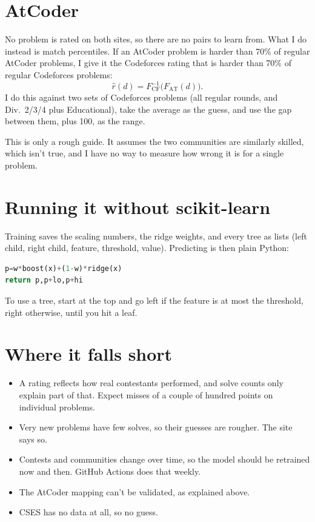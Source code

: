 \documentclass[11pt,a4paper]{article}
\begin{document}
\section{AtCoder}

No problem is rated on both sites, so there are no pairs to learn from. What I do instead is match percentiles. If an AtCoder problem is harder than 70\% of regular AtCoder problems, I give it the Codeforces rating that is harder than 70\% of regular Codeforces problems:
\begin{equation}
\hat r(d)=F_{\text{CF}}^{-1}\bigl(F_{\text{AT}}(d)\bigr).
\end{equation}
I do this against two sets of Codeforces problems (all regular rounds, and Div.~2/3/4 plus Educational), take the average as the guess, and use the gap between them, plus 100, as the range.

This is only a rough guide. It assumes the two communities are similarly skilled, which isn't true, and I have no way to measure how wrong it is for a single problem.

\section{Running it without scikit-learn}

Training saves the scaling numbers, the ridge weights, and every tree as lists (left child, right child, feature, threshold, value). Predicting is then plain Python:

\begin{lstlisting}[language=Python]
p=w*boost(x)+(1-w)*ridge(x)
return p,p+lo,p+hi
\end{lstlisting}

To use a tree, start at the top and go left if the feature is at most the threshold, right otherwise, until you hit a leaf.

\section{Where it falls short}

\begin{itemize}[nosep]
\item A rating reflects how real contestants performed, and solve counts only explain part of that. Expect misses of a couple of hundred points on individual problems.
\item Very new problems have few solves, so their guesses are rougher. The site says so.
\item Contests and communities change over time, so the model should be retrained now and then. GitHub Actions does that weekly.
\item The AtCoder mapping can't be validated, as explained above.
\item CSES has no data at all, so no guess.
\end{itemize}
\end{document}
